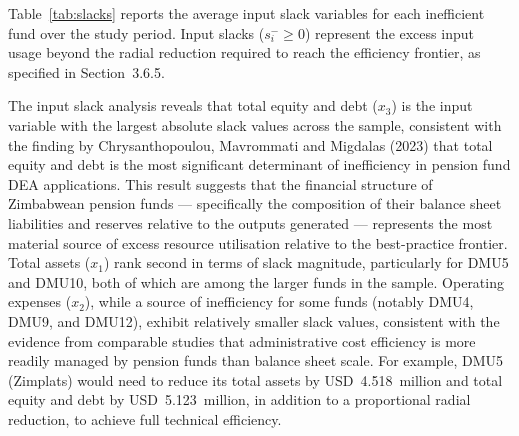 \documentclass[12pt,a4paper]{article}
\begin{document}
Table~\ref{tab:slacks} reports the average input slack variables for each inefficient fund over the study period. Input slacks ($s^-_i \geq 0$) represent the excess input usage beyond the radial reduction required to reach the efficiency frontier, as specified in Section~3.6.5.

\begin{table}[H]
\centering
\caption{Average input slacks for inefficient pension funds, 2021--2025 (USD millions). Source: Authors' calculations.}
\label{tab:slacks}
\end{table}

The input slack analysis reveals that total equity and debt ($x_3$) is the input variable with the largest absolute slack values across the sample, consistent with the finding by Chrysanthopoulou, Mavrommati and Migdalas (2023) that total equity and debt is the most significant determinant of inefficiency in pension fund DEA applications. This result suggests that the financial structure of Zimbabwean pension funds --- specifically the composition of their balance sheet liabilities and reserves relative to the outputs generated --- represents the most material source of excess resource utilisation relative to the best-practice frontier. Total assets ($x_1$) rank second in terms of slack magnitude, particularly for DMU5 and DMU10, both of which are among the larger funds in the sample. Operating expenses ($x_2$), while a source of inefficiency for some funds (notably DMU4, DMU9, and DMU12), exhibit relatively smaller slack values, consistent with the evidence from comparable studies that administrative cost efficiency is more readily managed by pension funds than balance sheet scale. For example, DMU5 (Zimplats) would need to reduce its total assets by USD~4.518~million and total equity and debt by USD~5.123~million, in addition to a proportional radial reduction, to achieve full technical efficiency.
\end{document}
